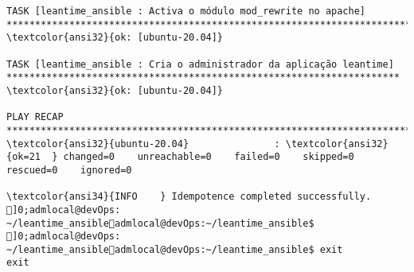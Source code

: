 \documentclass{scrartcl}
\begin{document}
\begin{Verbatim}
TASK [leantime_ansible : Activa o módulo mod_rewrite no apache] **************************************************************************
\textcolor{ansi32}{ok: [ubuntu-20.04]}

TASK [leantime_ansible : Cria o administrador da aplicação leantime] *********************************************************************
\textcolor{ansi32}{ok: [ubuntu-20.04]}

PLAY RECAP *******************************************************************************************************************************
\textcolor{ansi32}{ubuntu-20.04}               : \textcolor{ansi32}{ok=21  } changed=0    unreachable=0    failed=0    skipped=0    rescued=0    ignored=0

\textcolor{ansi34}{INFO    } Idempotence completed successfully.
]0;admlocal@devOps: ~/leantime_ansibleadmlocal@devOps:~/leantime_ansible$ 
]0;admlocal@devOps: ~/leantime_ansibleadmlocal@devOps:~/leantime_ansible$ exit
exit

\end{Verbatim}
\end{document}
